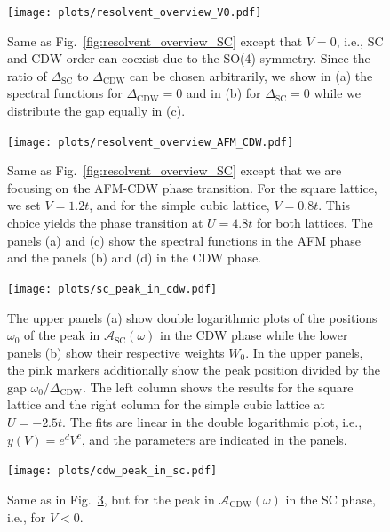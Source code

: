 \documentclass[
    reprint, 
    aps,
    preprintnumbers,
    twocolumn,
    prb,
    superscriptaddress
]{revtex4-2}
\newcommand{\spectral}[1]{\mathcal{A}_\text{#1}  (\omega)}
\begin{document}
\begin{figure}
    \centering
    \texttt{[image: plots/resolvent\_overview\_V0.pdf]}
    \caption{Same as Fig.\ \ref{fig:resolvent_overview_SC} except that  $V=0$, i.e., 
		SC and CDW order can coexist due to the SO(4) symmetry.
    Since the ratio of $\Delta_\text{SC}$ to $\Delta_\text{CDW}$ can be chosen arbitrarily, 
    we show in (a) the spectral functions for $\Delta_\text{CDW} = 0$ and in (b) for $\Delta_\text{SC} = 0$ while we distribute the gap equally in (c).}
    \label{fig:resolvent_overview_V0}
\end{figure}

\begin{figure}
    \centering
    \texttt{[image: plots/resolvent\_overview\_AFM\_CDW.pdf]}
    \caption{Same as Fig.\ \ref{fig:resolvent_overview_SC} except that we are focusing 
		on the AFM-CDW phase transition.
    For the square lattice, we set $V=1.2t$, and for the simple cubic lattice, $V=0.8t$. 
		This choice yields the phase transition at $U=4.8t$ for both lattices.
    The panels (a) and (c) show the spectral functions in the AFM phase and the 
		panels (b) and (d) in the CDW phase.}
    \label{fig:resolvent_overview_AFM}
\end{figure}

\begin{figure}
    \centering
    \texttt{[image: plots/sc\_peak\_in\_cdw.pdf]}
    \caption{The upper panels (a) show double logarithmic plots of the positions $\omega_0$ of the peak in $\spectral{SC}$ in the CDW phase 
    while the lower panels (b) show their respective weights $W_0$.
    In the upper panels, the pink markers additionally show the peak position divided by the gap $\omega_0 / \Delta_\text{CDW}$. 
    The left column shows the results for the square lattice and the right column for the simple cubic lattice at $U=-2.5t$. 
    The fits are linear in the double logarithmic plot, i.e., $y(V) = e^d V^c$, and the parameters are indicated in the panels.}
    \label{fig:sc_in_cdw_behavior}
\end{figure}

\begin{figure}
    \centering
    \texttt{[image: plots/cdw\_peak\_in\_sc.pdf]}
    \caption{Same as in Fig.\ \ref{fig:sc_in_cdw_behavior}, but for the peak in $\spectral{CDW}$ 
		in the SC phase, i.e., for $V<0$.}
    \label{fig:cdw_in_sc_behavior}
\end{figure}
\end{document}
